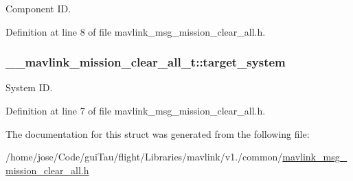 Component I\-D. 



Definition at line 8 of file mavlink\-\_\-msg\-\_\-mission\-\_\-clear\-\_\-all.\-h.

\hypertarget{struct____mavlink__mission__clear__all__t_ad628d39e2e099c3c1c015b15b7d4d150}{
\subsubsection[{target\-\_\-system}]{ \-\_\-\-\_\-mavlink\-\_\-mission\-\_\-clear\-\_\-all\-\_\-t\-::target\-\_\-system}}\label{struct____mavlink__mission__clear__all__t_ad628d39e2e099c3c1c015b15b7d4d150}


System I\-D. 



Definition at line 7 of file mavlink\-\_\-msg\-\_\-mission\-\_\-clear\-\_\-all.\-h.



The documentation for this struct was generated from the following file\-:\begin{DoxyCompactItemize}
\item 
/home/jose/\-Code/gui\-Tau/flight/\-Libraries/mavlink/v1./common/\hyperlink{mavlink__msg__mission__clear__all_8h}{mavlink\-\_\-msg\-\_\-mission\-\_\-clear\-\_\-all.\-h}\end{DoxyCompactItemize}
